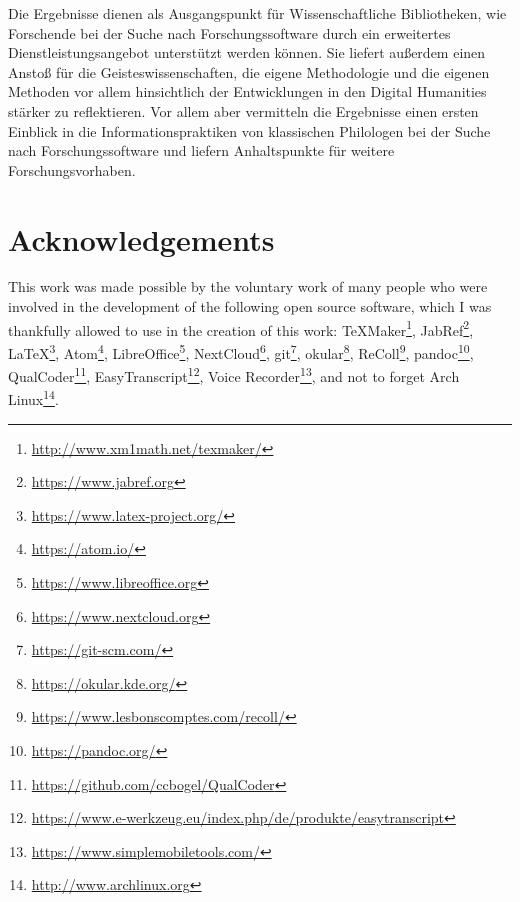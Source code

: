 \documentclass[12pt, a4paper, titlepage, oneside, abstract=true, toc=listof, toc=bibliography, BCOR=1cm]{scrreprt}
\begin{document}
{%
Die Ergebnisse dienen als Ausgangspunkt für Wissenschaftliche Bibliotheken, wie Forschende bei der Suche nach Forschungssoftware durch ein erweitertes Dienstleistungsangebot unterstützt werden können. Sie liefert außerdem einen Anstoß für die Geisteswissenschaften, die eigene Methodologie und die eigenen Methoden vor allem hinsichtlich der Entwicklungen in den Digital Humanities stärker zu reflektieren. Vor allem aber vermitteln die Ergebnisse einen ersten Einblick in die Informationspraktiken von klassischen Philologen bei der Suche nach Forschungssoftware und liefern Anhaltspunkte für weitere Forschungsvorhaben.

\chapter*{Acknowledgements}

This work was made possible by the voluntary work of many people who were involved in the development of the following open source software, which I was thankfully allowed to use in the creation of this work: TeXMaker\footnote{\url{http://www.xm1math.net/texmaker/}}, JabRef\footnote{\url{https://www.jabref.org}}, \LaTeX\footnote{\url{https://www.latex-project.org/}}, Atom\footnote{\url{https://atom.io/}}, LibreOffice\footnote{\url{https://www.libreoffice.org}}, NextCloud\footnote{\url{https://www.nextcloud.org}}, git\footnote{\url{https://git-scm.com/}}, okular\footnote{\url{https://okular.kde.org/}}, ReColl\footnote{\url{https://www.lesbonscomptes.com/recoll/}}, pandoc\footnote{\url{https://pandoc.org/}}, QualCoder\footnote{\url{https://github.com/ccbogel/QualCoder}}, EasyTranscript\footnote{\url{https://www.e-werkzeug.eu/index.php/de/produkte/easytranscript}}, Voice Recorder\footnote{\url{https://www.simplemobiletools.com/}}, and not to forget Arch Linux\footnote{\url{http://www.archlinux.org}}.

 
\cleardoublepage			

\cleardoublepage
\printglossary[type=software]
\label{sec:glossary}

}
\end{document}
